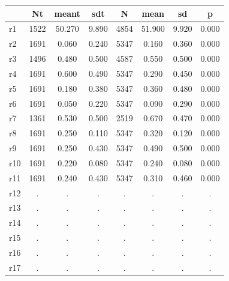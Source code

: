 \begin{table}[htbp]
\begin{tabular}{lccccccc} \hline \hline
 & Nt  & meant  & sdt  & N  & mean  & sd  & p  \\  \hline 
r1 &      1522 &    50.270 &     9.890 &      4854 &    51.900 &     9.920 &     0.000 \\  
r2 &      1691 &     0.060 &     0.240 &      5347 &     0.160 &     0.360 &     0.000 \\  
r3 &      1496 &     0.480 &     0.500 &      4587 &     0.550 &     0.500 &     0.000 \\  
r4 &      1691 &     0.600 &     0.490 &      5347 &     0.290 &     0.450 &     0.000 \\  
r5 &      1691 &     0.180 &     0.380 &      5347 &     0.360 &     0.480 &     0.000 \\  
r6 &      1691 &     0.050 &     0.220 &      5347 &     0.090 &     0.290 &     0.000 \\  
r7 &      1361 &     0.530 &     0.500 &      2519 &     0.670 &     0.470 &     0.000 \\  
r8 &      1691 &     0.250 &     0.110 &      5347 &     0.320 &     0.120 &     0.000 \\  
r9 &      1691 &     0.250 &     0.430 &      5347 &     0.490 &     0.500 &     0.000 \\  
r10 &      1691 &     0.220 &     0.080 &      5347 &     0.240 &     0.080 &     0.000 \\  
r11 &      1691 &     0.240 &     0.430 &      5347 &     0.310 &     0.460 &     0.000 \\  
r12 &         . &         . &         . &         . &         . &         . &         . \\  
r13 &         . &         . &         . &         . &         . &         . &         . \\  
r14 &         . &         . &         . &         . &         . &         . &         . \\  
r15 &         . &         . &         . &         . &         . &         . &         . \\  
r16 &         . &         . &         . &         . &         . &         . &         . \\  
r17 &         . &         . &         . &         . &         . &         . &         . \\  
\hline \hline \end{tabular}
\end{table}
